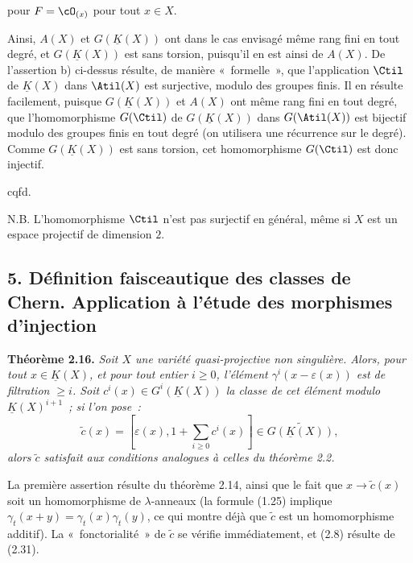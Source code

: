 pour $F=\cO_{(x)}$ pour tout $x\in X$.

Ainsi, $A(X)$ et $G(\underline K(X))$ ont dans le cas envisagé même rang fini en tout degré, et $G(\underline K(X))$ est sans torsion, puisqu'il en est ainsi de $A(X)$. De l'assertion b) ci-dessus résulte, de manière «~formelle~», que l'application $\Ctil$ de $\underline K(X)$ dans $\Atil(X)$ est surjective, modulo des groupes finis. Il en résulte facilement, puisque $G(\underline K(X))$ et $A(X)$ ont même rang fini en tout degré, que l'homomorphisme $G(\Ctil)$ de $G(\underline K(X))$ dans $G(\Atil(X))$ est bijectif modulo des groupes finis en tout degré (on utilisera une récurrence sur le degré). Comme $G(\underline K(X))$ est sans torsion, cet homomorphisme $G(\Ctil)$ est donc injectif.
\begin{flushright}cqfd.\end{flushright}

N.B. L'homomorphisme $\Ctil$ n'est pas surjectif en général, même si $X$ est un espace projectif de dimension $2$.

\subsection*{5. Définition faisceautique des classes de Chern. Application à l'étude des morphismes d'injection}

\textbf{Théorème 2.16.} \emph{Soit $X$ une variété quasi-projective non singulière. Alors, pour tout $x\in\underline K(X)$, et pour tout entier $i\geq0$, l'élément $\gamma^i(x-\varepsilon(x))$ est de filtration $\geq i$. Soit $c^i(x)\in G^i(\underline K(X))$ la classe de cet élément modulo $\underline K(X)^{i+1}$~; si l'on pose~:}
\[
 \widetilde c(x)=\left[\varepsilon(x),1+\sum_{i\geq0}c^i(x)\right]\in\widetilde{G(\underline K(X))},
\]
\emph{alors $\widetilde c$ satisfait aux conditions analogues à celles du théorème 2.2.}

La première assertion résulte du théorème 2.14, ainsi que le fait que $x\longrightarrow\widetilde c(x)$ soit un homomorphisme de $\lambda$-anneaux (la formule (1.25) implique $\gamma_t(x+y)=\gamma_t(x)\gamma_t(y)$, ce qui montre déjà que $\widetilde c$ est un homomorphisme additif). La «~fonctorialité~» de $\widetilde c$ se vérifie immédiatement, et (2.8) résulte de (2.31).
